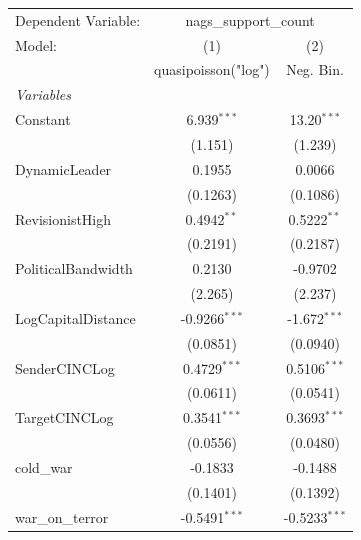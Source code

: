 
\begingroup
\centering
\begin{tabular}{lcc}
   \tabularnewline \midrule \midrule
   Dependent Variable: & \multicolumn{2}{c}{nags\_support\_count}\\
   Model:                                  & (1)                  & (2)\\  
                                           &  quasipoisson("log") & Neg. Bin.\\  
   \midrule
   \emph{Variables}\\
   Constant                                & 6.939$^{***}$        & 13.20$^{***}$\\   
                                           & (1.151)              & (1.239)\\   
   DynamicLeader                           & 0.1955               & 0.0066\\   
                                           & (0.1263)             & (0.1086)\\   
   RevisionistHigh                         & 0.4942$^{**}$        & 0.5222$^{**}$\\   
                                           & (0.2191)             & (0.2187)\\   
   PoliticalBandwidth                      & 0.2130               & -0.9702\\   
                                           & (2.265)              & (2.237)\\   
   LogCapitalDistance                      & -0.9266$^{***}$      & -1.672$^{***}$\\   
                                           & (0.0851)             & (0.0940)\\   
   SenderCINCLog                           & 0.4729$^{***}$       & 0.5106$^{***}$\\   
                                           & (0.0611)             & (0.0541)\\   
   TargetCINCLog                           & 0.3541$^{***}$       & 0.3693$^{***}$\\   
                                           & (0.0556)             & (0.0480)\\   
   cold\_war                               & -0.1833              & -0.1488\\   
                                           & (0.1401)             & (0.1392)\\   
   war\_on\_terror                         & -0.5491$^{***}$      & -0.5233$^{***}$\\   

\end{tabular}
